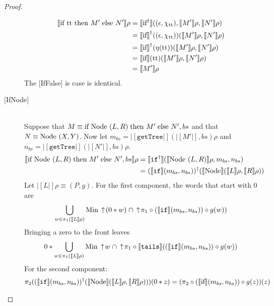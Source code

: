 \begin{proof}
\begin{description}
\begin{align*}
|[\If\true\then M'\;\Else N'|]\rho &= 
|[\If\!\!^{\dagger}|]((\epsilon, \chi_{\true\!\!}), |[M'|]\rho, |[N'|]\rho) \\
&= |[\If\!\!|]^{\dagger}((\epsilon, \chi_{\true\!\!}))(|[M'|]\rho, |[N'|]\rho) \\
&= |[\If\!\!|]^{\dagger}(\eta(\true\!\!))(|[M'|]\rho, |[N'|]\rho) \\
&= |[\If\!\!|](\true\!\!)(|[M'|]\rho, |[N'|]\rho) \\
&= |[M'|]\rho
\end{align*}
The [IfFalse] is case is identical.  
\item[{[}IfNode{]}] \hfill \\ 
Suppose that $M\equiv \textrm{if } \textrm{Node }(L,R)\;\textrm{then } M'\;\textrm{else } N',bs$ and that  
$N\equiv \textrm{Node }(X,Y)$.  Now let $m_{bs} = |[\texttt{getTree}|](|[M'|], bs)\rho$ and $n_{bs} = |[\texttt{getTree}|](|[N'|], bs)\rho$.
\begin{align*}
|[\textrm{if } \textrm{Node }(L,R)\;\textrm{then } M'\;\textrm{else } N',bs|]\rho &= 
|[\texttt{if}^{\dagger}|](|[\textrm{Node }(L,R)|]\rho, m_{bs}, n_{bs}) \\
&= (|[\texttt{if}|](m_{bs}, n_{bs}))^{\dagger}(|[\textrm{Node }\!\!|](|[L|]\rho,|[R|]\rho)) \\
\end{align*}
Let $|[L|]\rho \equiv (P,g)$.  For the first component, the words that start with 0 are
\begin{displaymath}
\bigcup_{w\in \pi_1(|[L|]\rho)} \textrm{Min} \,\uparrow\! (0*w) \;\cap
\,\uparrow\! \pi_1\circ (|[\texttt{if}|](m_{bs}, n_{bs}))\circ g(w))
\end{displaymath}
Bringing a zero to the front leaves
\begin{displaymath}
0 * \bigcup_{w\in \pi_1(|[L|]\rho)} \textrm{Min} \,\uparrow\! w \;\cap
\,\uparrow\! \pi_1\circ |[\texttt{tails}|]((|[\texttt{if}|](m_{bs}, n_{bs}))\circ g(w))
\end{displaymath}
For the second component:
\begin{align*}
\pi_2((|[\texttt{if}|](m_{bs}, n_{bs}))^{\dagger}(|[\textrm{Node }\!\!|](|[L|]\rho,|[R|]\rho)))(0*z) &= (\pi_2\circ (|[\text{if}|](m_{bs}, n_{bs}))\circ g(z))(z)
\end{align*}


\end{description}
\end{proof}
